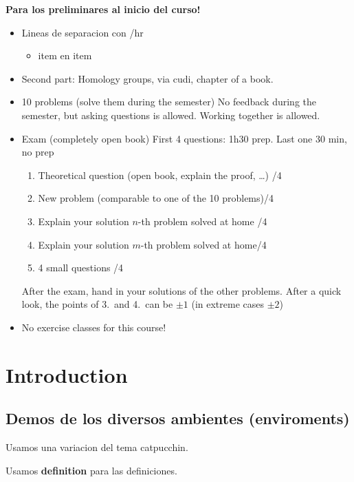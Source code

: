 \textbf{Para los preliminares al inicio del curso!}
\begin{itemize}
    \item Lineas de separacion con /hr
        \begin{itemize}
            \item item en item
        \end{itemize}
    \hr

    \item Second part: Homology groups, via cudi, chapter of a book.
    \item 10 problems (solve them during the semester) No feedback during the semester, but asking questions is allowed. Working together is allowed.
    \item Exam (completely open book) First 4 questions: 1h30 prep. Last one 30 min, no prep
        \begin{enumerate}
            \item Theoretical question (open book, explain the proof, \ldots) \hfill /4
            \item New problem (comparable to one of the 10 problems)\hfill /4
            \item Explain your solution $n$-th problem solved at home \hfill /4
            \item Explain your solution $m$-th problem solved at home\hfill /4
            \item 4 small questions \hfill /4
        \end{enumerate}
        After the exam, hand in your solutions of the other problems. After a quick look, the points of 3.\ and 4.\ can be $\pm 1$ (in extreme cases $\pm 2$)
    \item No exercise classes for this course!
\end{itemize}

\setcounter{chapter}{-1}
\chapter{Introduction}

\section{Demos de los diversos ambientes (enviroments)}


Usamos una variacion del tema catpucchin.



\begin{deff}
  Usamos \textbf{definition} para las definiciones.
\end{deff}

